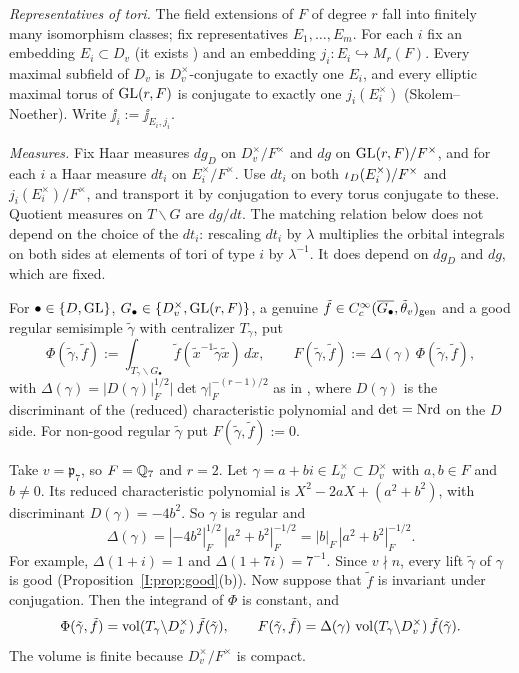 \emph{Representatives of tori.} The field extensions of $F$ of degree $r$ fall into finitely many isomorphism classes; fix representatives $E_1,\dots,E_m$. For each $i$ fix an embedding $E_i\subset D_v$ (it exists \cite[Ch.~XIII]{Wei73}) and an embedding $j_i:E_i\hookrightarrow M_r(F)$. Every maximal subfield of $D_v$ is $D_v^\times$-conjugate to exactly one $E_i$, and every elliptic maximal torus of $\mathrm{GL}(r,F)$ is conjugate to exactly one $j_i(E_i^\times)$ (Skolem--Noether). Write $\jj_i:=\jj_{E_i,j_i}$.

\emph{Measures.} Fix Haar measures $dg_D$ on $D_v^\times/F^\times$ and $dg$ on $\mathrm{GL}(r,F)/F^\times$, and for each $i$ a Haar measure $dt_i$ on $E_i^\times/F^\times$. Use $dt_i$ on both $\iota_D(E_i^\times)/F^\times$ and $j_i(E_i^\times)/F^\times$, and transport it by conjugation to every torus conjugate to these. Quotient measures on $T\backslash G$ are $dg/dt$. The matching relation below does not depend on the choice of the $dt_i$: rescaling $dt_i$ by $\lambda$ multiplies the orbital integrals on both sides at elements of tori of type $i$ by $\lambda^{-1}$. It does depend on $dg_D$ and $dg$, which are fixed.

\begin{definition}\label{I:def:oi}
For $\bullet\in\{D,\mathrm{GL}\}$, $G_\bullet\in\{D_v^\times,\mathrm{GL}(r,F)\}$, a genuine $\tilde f\in C_c^\infty(\overline{G_\bullet},\tilde\theta_v)_{\mathrm{gen}}$ and a good regular semisimple $\tilde\gamma$ with centralizer $T_\gamma$, put
\[ \Phi(\tilde\gamma,\tilde f):=\int_{T_\gamma\backslash G_\bullet}\tilde f(\tilde x^{-1}\tilde\gamma\tilde x)\,d\dot x,\qquad F(\tilde\gamma,\tilde f):=\Delta(\gamma)\,\Phi(\tilde\gamma,\tilde f), \]
with $\Delta(\gamma)=|D(\gamma)|_F^{1/2}|\det\gamma|_F^{-(r-1)/2}$ as in \cite[\S6]{FK86}, where $D(\gamma)$ is the discriminant of the (reduced) characteristic polynomial and $\det=\operatorname{Nrd}$ on the $D$ side. For non-good regular $\tilde\gamma$ put $F(\tilde\gamma,\tilde f):=0$.
\end{definition}

\begin{example}\label{I:ex:oi}
Take $v=\mathfrak p_7$, so $F=\mathbb{Q}_7$ and $r=2$. Let $\gamma=a+bi\in L_v^\times\subset D_v^\times$ with $a,b\in F$ and $b\neq0$. Its reduced characteristic polynomial is $X^2-2aX+(a^2+b^2)$, with discriminant $D(\gamma)=-4b^2$. So $\gamma$ is regular and
\[ \Delta(\gamma)=|{-4b^2}|_F^{1/2}\,|a^2+b^2|_F^{-1/2}=|b|_F\,|a^2+b^2|_F^{-1/2}. \]
For example, $\Delta(1+i)=1$ and $\Delta(1+7i)=7^{-1}$. Since $v\nmid n$, every lift $\tilde\gamma$ of $\gamma$ is good (Proposition~\ref{I:prop:good}(b)). Now suppose that $\tilde f$ is invariant under conjugation. Then the integrand of $\Phi$ is constant, and
\[ \Phi(\tilde\gamma,\tilde f)=\operatorname{vol}(T_\gamma\backslash D_v^\times)\,\tilde f(\tilde\gamma),\qquad F(\tilde\gamma,\tilde f)=\Delta(\gamma)\,\operatorname{vol}(T_\gamma\backslash D_v^\times)\,\tilde f(\tilde\gamma). \]
The volume is finite because $D_v^\times/F^\times$ is compact.
\end{example}



